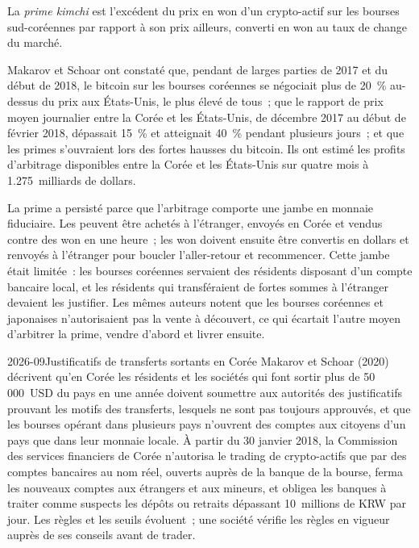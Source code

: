 \begin{definition}\label{def:m3:spot-markets:kimchi}
La \emph{prime kimchi} est l'excédent du prix en won d'un crypto-actif sur les bourses
sud-coréennes par rapport à son prix ailleurs, converti en won au taux de change du marché.
\end{definition}

Makarov et Schoar ont constaté que, pendant de larges parties de 2017 et du début de 2018, le bitcoin sur les bourses coréennes
se négociait plus de 20~\% au-dessus du prix aux États-Unis, le plus élevé de tous~; que le rapport de prix moyen journalier entre
la Corée et les États-Unis, de décembre 2017 au début de février 2018, dépassait 15~\% et atteignait 40~\% pendant plusieurs jours~;
et que les primes s'ouvraient lors des fortes hausses du bitcoin. Ils ont estimé les profits d'arbitrage disponibles
entre la Corée et les États-Unis sur quatre mois à 1.275~milliards de dollars.

La prime a persisté parce que l'arbitrage comporte une jambe en monnaie fiduciaire. Les  peuvent être achetés à l'étranger, envoyés en Corée
et vendus contre des won en une heure~; les won doivent ensuite être convertis en dollars et renvoyés à l'étranger pour boucler
l'aller-retour et recommencer. Cette jambe était limitée~: les bourses coréennes servaient des résidents disposant d'un compte
bancaire local, et les résidents qui transféraient de fortes sommes à l'étranger devaient les justifier. Les mêmes auteurs notent
que les bourses coréennes et japonaises n'autorisaient pas la vente à découvert, ce qui écartait l'autre moyen d'arbitrer la prime, vendre d'abord et livrer ensuite.

\begin{dated}{2026-09}{Justificatifs de transferts sortants en Corée}\label{dat:m3:spot-markets:korea}
Makarov et Schoar (2020) décrivent qu'en Corée les résidents et les sociétés qui font sortir plus de 50\,000~USD
du pays en une année doivent soumettre aux autorités des justificatifs prouvant les motifs des transferts,
lesquels ne sont pas toujours approuvés, et que les bourses opérant dans plusieurs pays n'ouvrent des comptes aux citoyens d'un pays que
dans leur monnaie locale. À partir du 30 janvier 2018, la Commission des services financiers de Corée n'autorisa le trading de crypto-actifs que
par des comptes bancaires au nom réel, ouverts auprès de la banque de la bourse, ferma les nouveaux comptes aux étrangers et
aux mineurs, et obligea les banques à traiter comme suspects les dépôts ou retraits dépassant 10~millions de KRW par jour. Les règles et les seuils évoluent~;
une société vérifie les règles en vigueur auprès de ses conseils avant de trader.
\end{dated}


